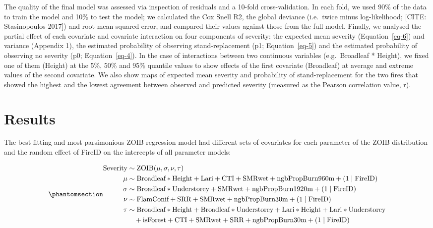 \documentclass[
  numafflabel,
  authoryear,
  preprint]{elsarticle}
\begin{document}
The quality of the final model was assessed via inspection of residuals
and a 10-fold cross-validation. In each fold, we used 90\% of the data
to train the model and 10\% to test the model; we calculated the Cox
Snell R2, the global deviance (i.e.~twice minus log-likelihood; {[}CITE:
Stasinopoulos-2017{]}) and root mean squared error, and compared their
values against those from the full model. Finally, we analysed the
partial effect of each covariate and covariate interaction on four
components of severity: the expected mean severity (Equation~\ref{eq-6})
and variance (Appendix 1), the estimated probability of observing
stand-replacement (p1; Equation~\ref{eq-5}) and the estimated
probability of observing no severity (p0; Equation~\ref{eq-4}). In the
case of interactions between two continuous variables (e.g.~Broadleaf *
Height), we fixed one of them (Height) at the 5\%, 50\% and 95\%
quantile values to show effects of the first covariate (Broadleaf) at
average and extreme values of the second covariate. We also show maps of
expected mean severity and probability of stand-replacement for the two
fires that showed the highest and the lowest agreement between observed
and predicted severity (measured as the Pearson correlation value, r).

\section{Results}\label{results}

The best fitting and most parsimonious ZOIB regression model had
different sets of covariates for each parameter of the ZOIB distribution
and the random effect of FireID on the intercepts of all parameter
models:

\begin{equation}\phantomsection\label{eq-7}{
\begin{aligned}
\text{Severity} &\sim \text{ZOIB}(\mu, \sigma, \nu, \tau) \\
\mu &\sim \text{Broadleaf} * \text{Height} + \text{Lari} + \text{CTI} + \text{SMRwet} + \text{ngbPropBurn960m} + (1 \mid \text{FireID}) \\
\sigma &\sim \text{Broadleaf} * \text{Understorey} + \text{SMRwet} + \text{ngbPropBurn1920m} + (1 \mid \text{FireID}) \\
\nu &\sim \text{FlamConif} + \text{SRR} + \text{SMRwet} + \text{ngbPropBurn30m} + (1 \mid \text{FireID}) \\
\tau &\sim \text{Broadleaf} * \text{Height} + \text{Broadleaf} * \text{Understorey} + \text{Lari} * \text{Height} + \text{Lari} * \text{Understorey} \\
     &\quad + \text{isForest} + \text{CTI} + \text{SMRwet} + \text{SRR} + \text{ngbPropBurn30m} + (1 \mid \text{FireID})
\end{aligned}
}\end{equation}
\end{document}
